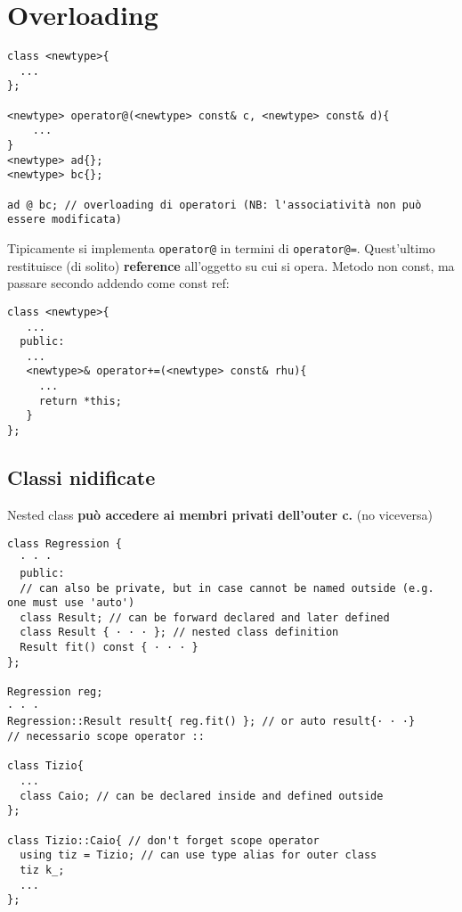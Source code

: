 \documentclass[10pt, oneside]{Book}
\begin{document}
\section{Overloading}
\begin{verbatim}
class <newtype>{
  ...
};

<newtype> operator@(<newtype> const& c, <newtype> const& d){ 
    ...
}
<newtype> ad{};
<newtype> bc{};

ad @ bc; // overloading di operatori (NB: l'associatività non può essere modificata)
\end{verbatim}
Tipicamente si implementa \texttt{operator@} in termini di \texttt{operator@=}. Quest'ultimo restituisce (di solito) \textbf{reference} all'oggetto su cui si opera. Metodo non const, ma passare secondo addendo come const ref:
\begin{verbatim}
class <newtype>{
   ...
  public:
   ...
   <newtype>& operator+=(<newtype> const& rhu){
     ...
     return *this;
   }
};
\end{verbatim}

\subsection{Classi nidificate}
Nested class \textbf{può accedere ai membri privati dell'outer c.} (no viceversa)

\begin{verbatim}
class Regression {
  · · ·
  public: 
  // can also be private, but in case cannot be named outside (e.g. one must use 'auto')
  class Result; // can be forward declared and later defined
  class Result { · · · }; // nested class definition
  Result fit() const { · · · }
};

Regression reg;
· · ·
Regression::Result result{ reg.fit() }; // or auto result{· · ·}
// necessario scope operator ::

class Tizio{
  ...
  class Caio; // can be declared inside and defined outside
};

class Tizio::Caio{ // don't forget scope operator
  using tiz = Tizio; // can use type alias for outer class
  tiz k_;
  ...
};
\end{verbatim}
\end{document}
